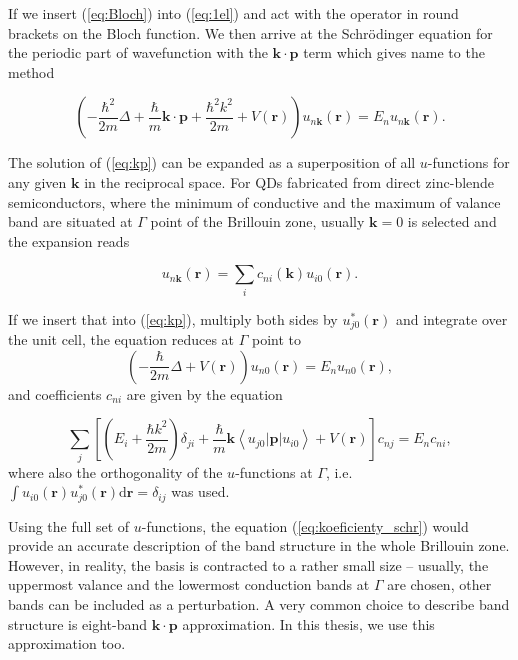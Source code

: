 If we insert (\ref{eq:Bloch}) into (\ref{eq:1el}) and act with the operator in round brackets on the Bloch function. We then arrive at the Schrödinger equation for the periodic part of wavefunction with the $\mathbf{k}\cdot\mathbf{p}$ term which gives name to the method

\begin{equation}
\left(-\frac{\hbar^2}{2m}\Delta+\frac{\hbar}{m}\mathbf{k}\cdot\mathbf{p}+\frac{\hbar^2 k^2}{2m}+V(\mathbf{r})\right)u_{n\mathbf{k}}(\mathbf{r})=E_nu_{n\mathbf{k}}(\mathbf{r}). \label{eq:kp}
\end{equation}

The solution of (\ref{eq:kp}) can be expanded as a superposition of all $u$-functions for any given $\mathbf{k}$ in the reciprocal space. For QDs fabricated from direct zinc-blende semiconductors, where the minimum of conductive and the maximum of valance band are situated at $\Gamma$ point of the Brillouin zone, usually $\mathbf{k}=0$ is selected and the expansion reads

\begin{equation}
\label{eqBlochSuper}
u_{n\mathbf{k}}(\mathbf{r})=\sum_i c_{ni}(\mathbf{k}) u_{i0}(\mathbf{r}).
\end{equation}

If we insert that into (\ref{eq:kp}), multiply both sides by $u_{j0}^*(\mathbf{r})$ and integrate over the unit cell, the equation reduces at $\Gamma$ point to 
\begin{equation}
\left(-\frac{\hbar}{2m}\Delta+V(\mathbf{r})\right)u_{n0}(\mathbf{r})=E_nu_{n0}(\mathbf{r}),
\end{equation}
and coefficients $c_{ni}$ are given by the equation

\begin{equation}
\sum_j\left[\left(E_i+\frac{\hbar k^2}{2m}\right) \delta_{ji}+\frac{\hbar}{m}\mathbf{k}\left<u_{j0}|\mathbf{p}|u_{i0}\right> +V(\mathbf{r}) \right]c_{nj}=E_nc_{ni}, \label{eq:koeficienty_schr}
\end{equation}
where also the orthogonality of the $u$-functions at $\Gamma$, i.e.~$\int u_{i0}(\mathbf{r})u_{j0}^*(\mathbf{r})\mathrm{d}\mathbf{r}=\delta_{ij}$ was used.

Using the full set of $u$-functions, the equation (\ref{eq:koeficienty_schr}) would provide an accurate description of the band structure in the whole Brillouin zone. However, in reality, the basis is contracted to a rather small size -- usually, the uppermost valance and the lowermost conduction bands at $\Gamma$ are chosen, other bands can be included as a perturbation. A very common choice to describe band structure is eight-band $\mathbf{k\cdot p}$ approximation. In this thesis, we use this approximation too.

